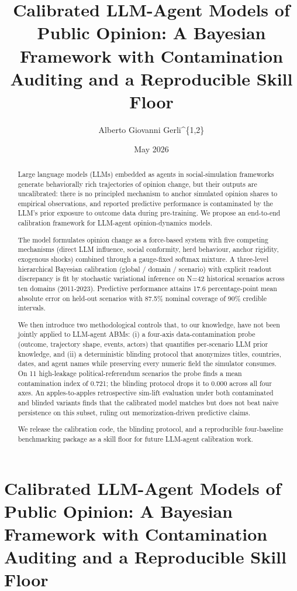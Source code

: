 \documentclass[
]{article}
\title{Calibrated LLM-Agent Models of Public Opinion: A Bayesian
Framework with Contamination Auditing and a Reproducible Skill Floor}
\author{Alberto Giovanni Gerli\^{}\{1,2\}}
\date{May 2026}
\begin{document}
\maketitle
\begin{abstract}
Large language models (LLMs) embedded as agents in social-simulation
frameworks generate behaviorally rich trajectories of opinion change,
but their outputs are uncalibrated: there is no principled mechanism to
anchor simulated opinion shares to empirical observations, and reported
predictive performance is contaminated by the LLM's prior exposure to
outcome data during pre-training. We propose an end-to-end calibration
framework for LLM-agent opinion-dynamics models.

The model formulates opinion change as a force-based system with five
competing mechanisms (direct LLM influence, social conformity, herd
behaviour, anchor rigidity, exogenous shocks) combined through a
gauge-fixed softmax mixture. A three-level hierarchical Bayesian
calibration (global / domain / scenario) with explicit readout
discrepancy is fit by stochastic variational inference on N=42
historical scenarios across ten domains (2011-2023). Predictive
performance attains 17.6 percentage-point mean absolute error on
held-out scenarios with 87.5\% nominal coverage of 90\% credible
intervals.

We then introduce two methodological controls that, to our knowledge,
have not been jointly applied to LLM-agent ABMs: (i) a four-axis
data-contamination probe (outcome, trajectory shape, events, actors)
that quantifies per-scenario LLM prior knowledge, and (ii) a
deterministic blinding protocol that anonymizes titles, countries,
dates, and agent names while preserving every numeric field the
simulator consumes. On 11 high-leakage political-referendum scenarios
the probe finds a mean contamination index of 0.721; the blinding
protocol drops it to 0.000 across all four axes. An apples-to-apples
retrospective sim-lift evaluation under both contaminated and blinded
variants finds that the calibrated model matches but does not beat naive
persistence on this subset, ruling out memorization-driven predictive
claims.

We release the calibration code, the blinding protocol, and a
reproducible four-baseline benchmarking package as a skill floor for
future LLM-agent calibration work.
\end{abstract}

\section{Calibrated LLM-Agent Models of Public Opinion: A Bayesian
Framework with Contamination Auditing and a Reproducible Skill
Floor}\label{calibrated-llm-agent-models-of-public-opinion-a-bayesian-framework-with-contamination-auditing-and-a-reproducible-skill-floor}
\end{document}
